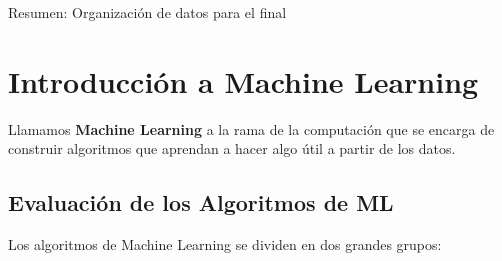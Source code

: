 \documentclass[titlepage,a4paper]{article}
\begin{document}
\begin{huge}
Resumen: Organización de datos para el final
\end{huge}

\section*{Introducción a Machine Learning}
Llamamos \textbf{Machine Learning} a la rama de la computación que se encarga de construir algoritmos que aprendan a hacer algo útil a partir de los datos. \\

\subsection*{Evaluación de los Algoritmos de ML}
Los algoritmos de Machine Learning se dividen en dos grandes grupos: 
\end{document}
